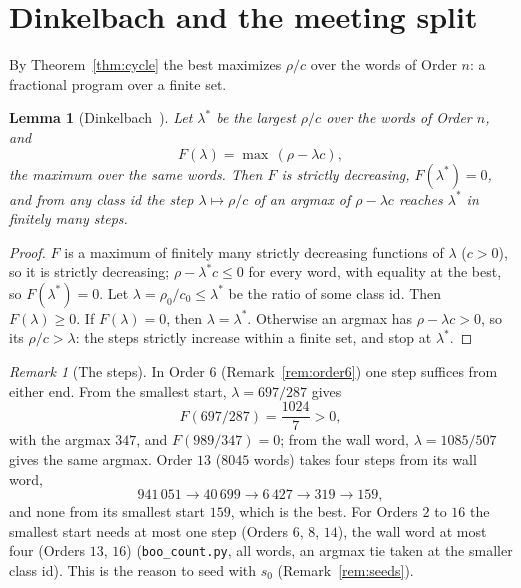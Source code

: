 \documentclass[10pt,a4paper,titlepage]{article}
\makeatletter
\newcommand{\termhere}[1]{\leavevmode
  \Hy@raisedlink{\hyper@anchorstart{term:#1}\hyper@anchorend}}
\newcommand{\keysym}[2]{\hyperlink{box:#1}{#2}}
\theoremstyle{plain}
\newtheorem{lemma}[theorem]{Lemma}
\theoremstyle{definition}
\theoremstyle{remark}
\newtheorem{remark}[theorem]{Remark}
\makeatother
\begin{document}
\section{Dinkelbach and the meeting split}
\label{sec:dinkelbach}

By Theorem~\ref{thm:cycle} the best maximizes $\rho/c$ over the words of Order $n$: a fractional
program over a finite set.

\begin{lemma}[Dinkelbach~\cite{Dinkelbach1967}]
\label{lem:dinkelbach}
\termhere{lambdastar}Let \keysym{lambdastar}{$\lambda^\ast$} be the largest $\rho/c$ over the words of Order $n$, and
\[
F(\lambda) = \max\,(\rho - \lambda c),
\]
the maximum over the same words. Then $F$ is strictly decreasing, $F(\lambda^\ast) = 0$, and from any class id the step
$\lambda \mapsto \rho/c$ of an argmax of $\rho - \lambda c$ reaches $\lambda^\ast$ in finitely many steps.
\end{lemma}
\begin{proof}
$F$ is a maximum of finitely many strictly decreasing functions of $\lambda$ ($c > 0$), so it is strictly
decreasing; $\rho - \lambda^\ast c \le 0$ for every word, with equality at the best, so $F(\lambda^\ast) = 0$.
Let $\lambda = \rho_0/c_0 \le \lambda^\ast$ be the ratio of some class id. Then $F(\lambda) \ge 0$. If
$F(\lambda) = 0$, then $\lambda = \lambda^\ast$. Otherwise an argmax has $\rho - \lambda c > 0$, so its
$\rho/c > \lambda$: the steps strictly increase within a finite set, and stop at $\lambda^\ast$.
\end{proof}

\begin{remark}[The steps]
\label{rem:steps}
In Order $6$ (Remark~\ref{rem:order6}) one step suffices from either end. From the smallest start,
$\lambda = 697/287$ gives
\[
F(697/287) = \frac{1024}{7} > 0,
\]
with the argmax $347$, and $F(989/347) = 0$; from the wall word, $\lambda = 1085/507$ gives the same
argmax. Order $13$ ($8045$ words) takes four steps from its wall word,
\[
941\,051 \to 40\,699 \to 6\,427 \to 319 \to 159,
\]
and none from its smallest start $159$, which is the best. For Orders $2$ to $16$ the smallest start
needs at most one step (Orders $6$, $8$, $14$), the wall word at most four (Orders $13$, $16$)
(\texttt{boo\_count.py}, all words, an argmax tie taken at the smaller class id). This is the reason to
seed with $s_0$ (Remark~\ref{rem:seeds}).
\end{remark}
\end{document}
